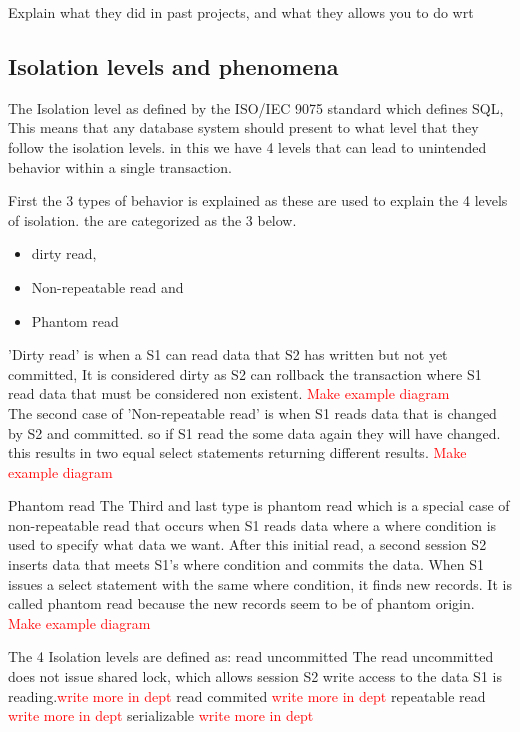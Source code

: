 \documentclass[
  a4paper,  %
  twoside,  %
  bibliography=totoc,
  headsepline,
  cleardoublepage=empty,
  parskip=half,
  draft=false
]{scrbook}
\begin{document}
Explain what they did in past projects, and what they allows you to do wrt 







\subsection{Isolation levels and phenomena}

The Isolation level as defined by the ISO/IEC 9075 standard which defines SQL, This means that any database system should present to what level that they follow the isolation levels. in this we have 4 levels that can lead to unintended behavior within a single transaction. 

First the 3 types of behavior is explained as these are used to explain the 4 levels of isolation. the are categorized as the 3 below.
\begin{itemize}
\item dirty read,
\item Non-repeatable read and
\item Phantom read
\end{itemize}

'Dirty read' is when a S1 can read data that S2 has written but not yet committed, It is considered dirty as S2 can rollback the transaction where S1 read data that must be considered non existent. \textcolor{red}{Make example diagram} 
\\
The second case of 'Non-repeatable read' is when S1 reads data that is changed by S2 and committed. so if S1 read the some data again they will have changed. this results in two equal select statements returning different results.  \textcolor{red}{Make example diagram} 

Phantom read
The Third and last type is phantom read which is a special case of non-repeatable read that occurs when S1 reads data where a where condition is used to specify what data we want. After this initial read, a second session S2 inserts data that meets S1's where condition and commits the data. When S1 issues a select statement with the same where condition, it finds new records. It is called phantom read because the new records seem to be of phantom origin.
 \textcolor{red}{Make example diagram} 

The 4 Isolation levels are defined as:
read uncommitted
       The read uncommitted does not issue shared lock, which allows session S2 write access to the data S1 is reading.\textcolor{red}{write more in dept} 
 read commited
 \textcolor{red}{write more in dept} 
repeatable read
\textcolor{red}{write more in dept} 
serializable
\textcolor{red}{write more in dept} 
\end{document}
